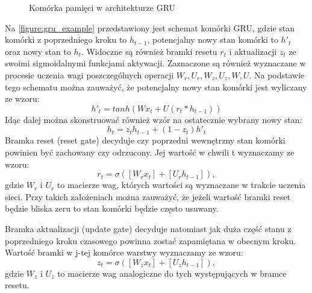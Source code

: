 \documentclass[10pt,a4paper]{article}
\begin{document}
\begin{figure}[!ht]
	\centering
	\caption{Komórka pamięci w architekturze GRU}
	\label{figure:gru_example}
\end{figure}
\FloatBarrier

Na \autoref{figure:gru_example} przedstawiony jest schemat komórki GRU, gdzie stan komórki z poprzedniego kroku to $h_{t-1}$, potencjalny nowy stan komórki to $h'_t$ oraz nowy stan to $h_t$. Widoczne są również bramki resetu $r_t$ i aktualizacji $z_t$ ze swoimi sigmoidalnymi funkcjami aktywacji. Zaznaczone są również wyznaczane w procesie uczenia wagi poszczególnych operacji $W_r, U_r, W_z, U_z, W, U$. Na podstawie tego schematu można zauważyć, że potencjalny nowy stan komórki jest wyliczany ze wzoru:
\begin{equation}
	h'_t = tanh(Wx_t + U(r_t * h_{t-1}))
\end{equation}
Idąc dalej można skonstruować również wzór na ostatecznie wybrany nowy stan:
\begin{equation}
	h_t = z_th_{t-1} + (1 - z_t)h'_t
\end{equation}
Bramka reset (reset gate) decyduje czy poprzedni wewnętrzny stan komórki powinien być zachowany czy odrzucony. Jej wartość w chwili t wyznaczamy ze wzoru:
\begin{equation}
	r_t = \sigma([W_rx_t] + [U_rh_{t-1}]),
\end{equation} 
gdzie $W_r$ i $U_r$ to macierze wag, których wartości są wyznaczane w trakcie uczenia sieci. Przy takich założeniach można zauważyć, że jeżeli wartość bramki reset będzie bliska zeru to stan komórki będzie często usuwany.

Bramka aktualizacji (update gate) decyduje natomiast jak duża część stanu z poprzedniego kroku czasowego powinna zostać zapamiętana w obecnym kroku. Wartość bramki w j-tej komórce warstwy wyznaczamy ze wzoru:
\begin{equation}
	z_t = \sigma([W_zx_t] + [U_zh_{t-1}]),
\end{equation} 
gdzie $W_z$ i $U_z$ to macierze wag analogiczne do tych występujących w bramce resetu. 
\end{document}

